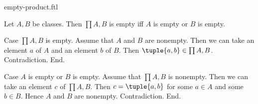 \documentclass{article}
\begin{document}
\begin{smodule}[creators={Marcel Schütz}]{empty-product.ftl}

  \begin{fproposition*}[label=3585989995921408]
    Let $A, B$ be classes.
    Then $\prod{A,B}$ is empty iff $A$ is empty or $B$ is empty.
  \end{fproposition*}
  \begin{fproof}
    Case $\prod{A,B}$ is empty.
      Assume that $A$ and $B$ are nonempty.
      Then we can take an element $a$ of $A$ and an element $b$ of $B$.
      Then $\tuple{a,b} \in \prod{A,B}$.
      Contradiction.
    End.

    Case $A$ is empty or $B$ is empty.
      Assume that $\prod{A,B}$ is nonempty.
      Then we can take an element $c$ of $\prod{A,B}$.
      Then $c = \tuple{a,b}$ for some $a \in A$ and some $b \in B$.
      Hence $A$ and $B$ are nonempty.
      Contradiction.
    End.
  \end{fproof}
\end{smodule}
\end{document}

